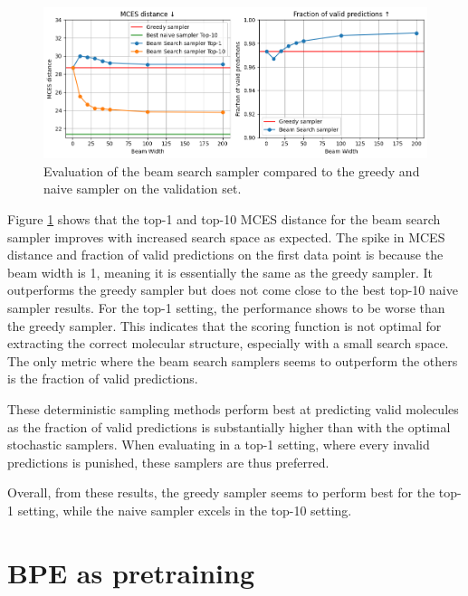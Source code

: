 \begin{figure}[h]
    \centering
    \includegraphics[width=1.0\textwidth]{figures/results/samplers/beam_search.png}
    \caption{Evaluation of the beam search sampler compared to the greedy and naive sampler on the validation set.}
    \label{fig:beam-search}
\end{figure}

Figure \ref{fig:beam-search} shows that the top-1 and top-10 MCES distance for the beam search sampler improves with increased search space as expected.
The spike in MCES distance and fraction of valid predictions on the first data point is because the beam width is 1, meaning it is essentially the same as the greedy sampler.
It outperforms the greedy sampler but does not come close to the best top-10 naive sampler results. 
For the top-1 setting, the performance shows to be worse than the greedy sampler.
This indicates that the scoring function is not optimal for extracting the correct molecular structure, especially with a small search space.
The only metric where the beam search samplers seems to outperform the others is the fraction of valid predictions.

These deterministic sampling methods perform best at predicting valid molecules as the fraction of valid predictions is substantially higher than with the optimal stochastic samplers.
When evaluating in a top-1 setting, where every invalid predictions is punished, these samplers are thus preferred.

Overall, from these results, the greedy sampler seems to perform best for the top-1 setting, while the naive sampler excels in the top-10 setting.


\section{\ac{BPE} as pretraining}

